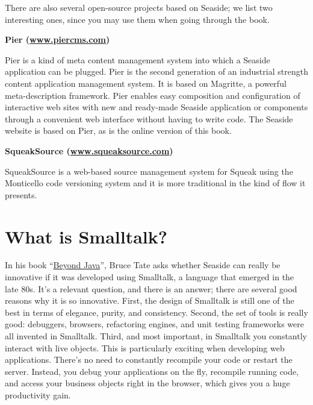 \documentclass[a4paper,10pt,twoside]{book}
\begin{document}
There are also several open-source projects based on Seaside; we list two interesting ones, since you may use them when going through the book.

\begin{list}{}{}
\item\hspace{-\labelwidth}\textbf{ \textbf{Pier} (\href{http://www.piercms.com/}{www.piercms.com}) }
\item  Pier is a kind of meta content management system into which a Seaside application can be plugged. Pier is the second generation of an industrial strength content application management system. It is based on Magritte, a powerful meta-description framework. Pier enables easy composition and configuration of interactive web sites with new and ready-made Seaside application or components through a convenient web interface without having to write code. The Seaside website is based on Pier, as is the online version of this book.
\item\hspace{-\labelwidth}\textbf{ \textbf{SqueakSource} (\href{http://www.squeaksource.com/}{www.squeaksource.com}) }
\item  SqueakSource is a web-based source management system for Squeak using the Monticello code versioning system and it is more traditional in the kind of flow it presents.
\end{list}

\section{What is Smalltalk?}
\label{book:introduction:whatissmalltalk}

In his book ``\href{http://oreilly.com/catalog/9780596100940/}{Beyond Java}'', Bruce Tate asks whether Seaside can really be innovative if it was developed using Smalltalk, a language that emerged in the late 80s. It's a relevant question, and there is an answer; there are several good reasons why it is so innovative. First, the design of Smalltalk is still one of the best in terms of elegance, purity, and consistency. Second, the set of tools is really good: debuggers, browsers, refactoring engines, and unit testing frameworks were all invented in Smalltalk. Third, and most important, in Smalltalk you constantly interact with live objects. This is particularly exciting when developing web applications. There's no need to constantly recompile your code or restart the server. Instead, you debug your applications on the fly, recompile running code, and access your business objects right in the browser, which gives you a huge productivity gain.
\end{document}
